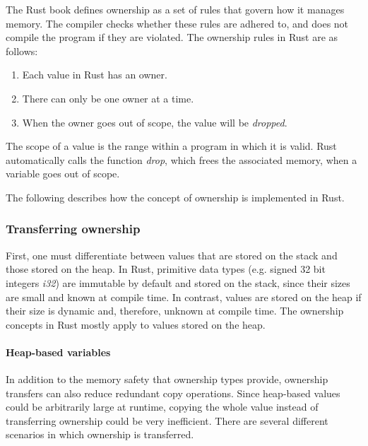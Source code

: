 \documentclass[sigplan,11pt,nonacm]{acmart}
\begin{document}
The Rust book \cite{rust-book} defines ownership as a set of rules that govern how it manages memory.
The compiler checks whether these rules are adhered to, and does not compile the program if they are violated.
The ownership rules in Rust are as follows:
\begin{enumerate}
  \item Each value in Rust has an owner.
  \item There can only be one owner at a time.
  \item When the owner goes out of scope, the value will be \emph{dropped}.
\end{enumerate}
The scope of a value is the range within a program in which it is valid.
Rust automatically calls the function \emph{drop}, which frees the associated memory, when a variable goes out of scope.


The following describes how the concept of ownership is implemented in Rust.

\subsubsection{Transferring ownership}

First, one must differentiate between values that are stored on the stack and those stored on the heap.
In Rust, primitive data types (e.g. signed 32 bit integers \emph{i32}) are immutable by default and stored on the stack, since their sizes are small and known at compile time.
In contrast, values are stored on the heap if their size is dynamic and, therefore, unknown at compile time.
The ownership concepts in Rust mostly apply to values stored on the heap.

\paragraph{Heap-based variables}

In addition to the memory safety that ownership types provide, ownership transfers can also reduce redundant copy operations.
Since heap-based values could be arbitrarily large at runtime, copying the whole value instead of transferring ownership could be very inefficient.
There are several different scenarios in which ownership is transferred.
\end{document}
